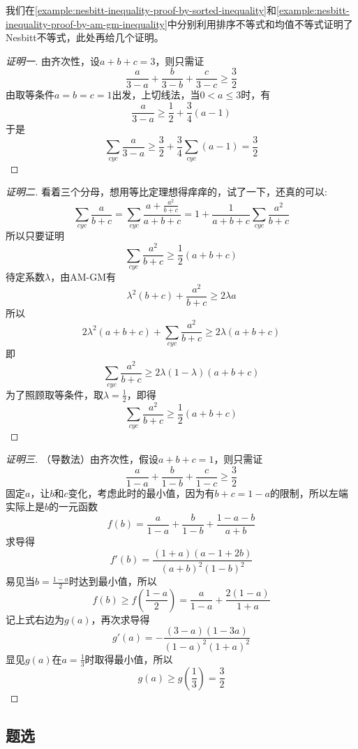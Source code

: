 \begin{example}[Nesbitt不等式的其它证法]
  我们在\autoref{example:nesbitt-inequality-proof-by-sorted-inequality}和\autoref{example:nesbitt-inequality-proof-by-am-gm-inequality}中分别利用排序不等式和均值不等式证明了Nesbitt不等式，此处再给几个证明。

  \begin{proof}[证明一]
    由齐次性，设$a+b+c=3$，则只需证
\[ \frac{a}{3-a}+\frac{b}{3-b}+\frac{c}{3-c} \geqslant \frac{3}{2} \]
由取等条件$a=b=c=1$出发，上切线法，当$0<a\leqslant 3$时，有
\[ \frac{a}{3-a} \geqslant \frac{1}{2}+\frac{3}{4}(a-1) \]
于是
\[ \sum_{cyc} \frac{a}{3-a} \geqslant \frac{3}{2} + \frac{3}{4}\sum_{cyc}(a-1) =\frac{3}{2} \]
  \end{proof}

  \begin{proof}[证明二]
 看着三个分母，想用等比定理想得痒痒的，试了一下，还真的可以:
\[ \sum_{cyc} \frac{a}{b+c}=\sum_{cyc}\frac{a+\frac{a^2}{b+c}}{a+b+c} = 1 + \frac{1}{a+b+c}\sum_{cyc}\frac{a^2}{b+c} \]
所以只要证明
\[ \sum_{cyc}\frac{a^2}{b+c} \geqslant \frac{1}{2}(a+b+c) \]
待定系数$\lambda$，由AM-GM有
\[ \lambda^2(b+c)+\frac{a^2}{b+c} \geqslant 2\lambda a \]
所以
\[ 2\lambda^2(a+b+c)+\sum_{cyc}\frac{a^2}{b+c} \geqslant 2\lambda (a+b+c) \]
即
\[ \sum_{cyc}\frac{a^2}{b+c} \geqslant 2\lambda(1-\lambda) (a+b+c) \]
为了照顾取等条件，取$\lambda=\frac{1}{2}$，即得
\[ \sum_{cyc}\frac{a^2}{b+c} \geqslant \frac{1}{2}(a+b+c) \]   
  \end{proof}

  \begin{proof}[证明三]
    （导数法）由齐次性，假设$a+b+c=1$，则只需证
\[ \frac{a}{1-a}+ \frac{b}{1-b} + \frac{c}{1-c} \geqslant \frac{3}{2} \]
固定$a$，让$b$和$c$变化，考虑此时的最小值，因为有$b+c=1-a$的限制，所以左端实际上是$b$的一元函数
\[ f(b)= \frac{a}{1-a}+ \frac{b}{1-b} + \frac{1-a-b}{a+b} \]
求导得
\[ f'(b)=\frac{(1+a)(a-1+2b)}{(a+b)^2(1-b)^2} \]
易见当$b=\frac{1-a}{2}$时达到最小值，所以
\[ f(b) \geqslant f \left( \frac{1-a}{2} \right) = \frac{a}{1-a} + \frac{2(1-a)}{1+a} \]
记上式右边为$g(a)$，再次求导得
\[ g'(a)=-\frac{(3-a)(1-3a)}{(1-a)^2(1+a)^2} \]
显见$g(a)$在$a=\frac{1}{3}$时取得最小值，所以
\[ g(a) \geqslant g \left( \frac{1}{3} \right) = \frac{3}{2} \]
  \end{proof}
\end{example}

\subsection{题选}
\label{sec:exercise-for-inequality}


